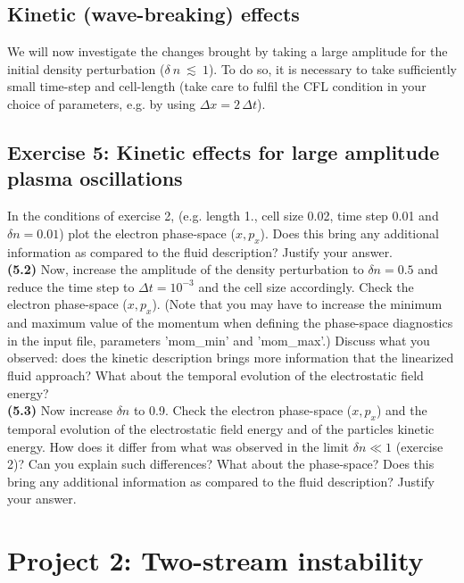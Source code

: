 \documentclass[11pt,a4paper]{article}
\begin{document}
\subsection*{Kinetic (wave-breaking) effects}

We will now investigate the changes brought by taking a large amplitude for the initial density perturbation ($\delta~n~\lesssim~1$). To do so, it is necessary to take sufficiently small time-step and cell-length (take care to fulfil the CFL condition in your choice of parameters, e.g. by using $\Delta x = 2\,\Delta t $).

\subsection*{Exercise 5: Kinetic effects for large amplitude plasma oscillations}

  In the conditions of exercise 2, (e.g. length 1., cell size 0.02, time step 0.01 and $\delta n = 0.01$) plot the electron phase-space ($x,p_x$). Does this bring any additional information as compared to the fluid description? Justify your answer.\\
{\bf (5.2)} Now, increase the amplitude of the density perturbation to $\delta n = 0.5$ and reduce the time step to $\Delta t =  10^{-3}$ and the cell size accordingly. Check  the electron phase-space ($x,p_x$). (Note that you may have to increase the minimum and maximum value of the momentum when defining the phase-space diagnostics in the input file, parameters 'mom\_min' and 'mom\_max'.) Discuss what you observed: does the kinetic description brings more information that the linearized fluid approach? What about the temporal evolution of the electrostatic field energy?\\
{\bf (5.3)} Now increase $\delta n$ to 0.9. Check the  electron phase-space ($x,p_x$) and the temporal evolution of the electrostatic field energy and of the particles kinetic energy. How does it differ from what was observed in the limit $\delta n \ll 1$ (exercise 2)? Can you explain such differences? What about the phase-space? Does this bring any additional information as compared to the fluid description? Justify your answer.\\


\section*{Project 2: Two-stream instability}\label{proj2}
\end{document}
